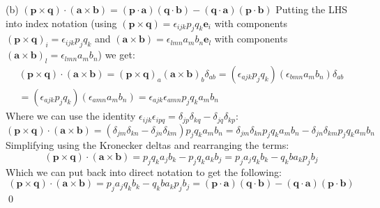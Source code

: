 \medskip
(b) $(\bm{p} \times \bm{q}) \cdot (\bm{a} \times \bm{b}) = (\bm{p} \cdot \bm{a}) (\bm{q} \cdot \bm{b}) - (\bm{q} \cdot \bm{a})(\bm{p} \cdot \bm{b})$ \newline
Putting the LHS into index notation (using $(\bm{p} \times \bm{q}) = \epsilon_{ijk}p_jq_k\bm{e}_i$ with components $(\bm{p} \times \bm{q})_i = \epsilon_{ijk}p_jq_k$ and $(\bm{a} \times \bm{b}) = \epsilon_{lmn}a_mb_n\bm{e}_l$ with components $(\bm{a} \times \bm{b})_l = \epsilon_{lmn}a_mb_n$) we get:
\begin{equation}
\begin{split}
    (\bm{p} \times \bm{q}) \cdot (\bm{a} \times \bm{b}) = (\bm{p} \times \bm{q})_a(\bm{a} \times \bm{b})_b \delta_{ab} =  (\epsilon_{ajk}p_jq_k)(\epsilon_{bmn}a_mb_n)\delta_{ab} \\
    = (\epsilon_{ajk}p_jq_k)(\epsilon_{amn}a_mb_n) = \epsilon_{ajk}\epsilon_{amn}p_jq_ka_mb_n
\end{split}
\end{equation}
Where we can use the identity $\epsilon_{ijk}\epsilon_{ipq} = \delta_{jp}\delta_{kq} - \delta_{jq}\delta_{kp}$:
\begin{equation}
    (\bm{p} \times \bm{q}) \cdot (\bm{a} \times \bm{b}) =(\delta_{jm}\delta_{kn} - \delta_{jn}\delta_{km})p_jq_ka_mb_n = \delta_{jm}\delta_{kn}p_jq_ka_mb_n - \delta_{jn}\delta_{km}p_jq_ka_mb_n 
\end{equation}
Simplifying using the Kronecker deltas and rearranging the terms:
\begin{equation}
    (\bm{p} \times \bm{q}) \cdot (\bm{a} \times \bm{b}) = p_jq_ka_jb_k - p_jq_ka_kb_j = p_ja_jq_kb_k - q_kba_kp_jb_j
\end{equation}
Which we can put back into direct notation to get the following:
\begin{equation}
    (\bm{p} \times \bm{q}) \cdot (\bm{a} \times \bm{b}) = p_ja_jq_kb_k - q_kba_kp_jb_j = (\bm{p} \cdot \bm{a}) (\bm{q} \cdot \bm{b}) - (\bm{q} \cdot \bm{a})(\bm{p} \cdot \bm{b})
\end{equation} \qed

